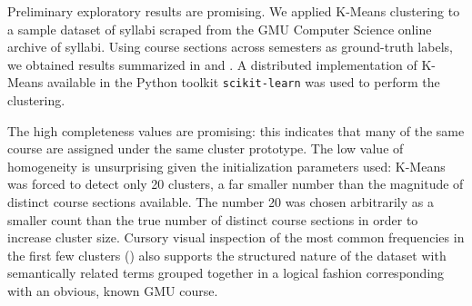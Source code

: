 Preliminary exploratory results are promising. We applied K-Means
clustering to a sample dataset of syllabi scraped from the GMU Computer
Science online archive of syllabi. Using course sections across semesters
as ground-truth labels, we obtained results summarized in
 and . A
distributed implementation of K-Means available in the Python toolkit
\texttt{scikit-learn} was used to perform the clustering.

The high completeness values are promising: this indicates that many of the
same course are assigned under the same cluster prototype. The low value of
homogeneity is unsurprising given the initialization parameters used:
K-Means was forced to detect only 20 clusters, a far smaller number than
the magnitude of distinct course sections available. The number 20 was
chosen arbitrarily as a smaller count than the true number of distinct
course sections in order to increase cluster size. Cursory visual
inspection of the most common frequencies in the first few clusters
() also supports the structured nature of the
dataset with semantically related terms grouped together in a logical
fashion corresponding with an obvious, known GMU course.

